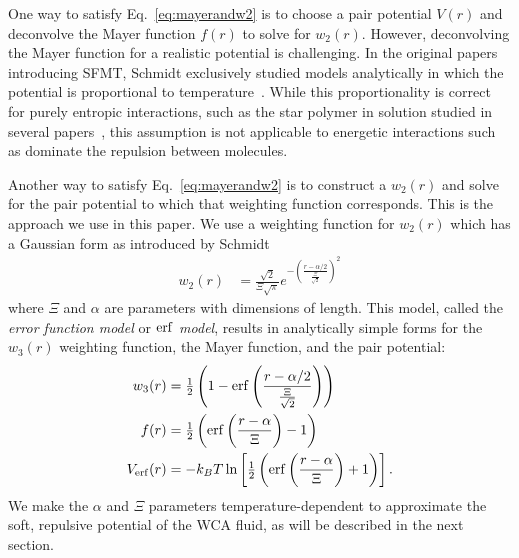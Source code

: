 \documentclass[letterpaper,twocolumn,amsmath,amssymb,prb]{revtex4-1}
\begin{document}
One way to satisfy Eq.~\ref{eq:mayerandw2} is to choose a pair 
potential $V(r)$ and deconvolve the Mayer function $f(r)$ to solve for $w_2(r)$. 
However, deconvolving the Mayer function for a realistic potential is 
challenging. %
In the original papers introducing SFMT, Schmidt
exclusively studied models analytically in which the potential is
proportional to temperature~\cite{schmidt1999density,
  schmidt2000fluid}.  While this proportionality is correct for purely
entropic interactions, such as the star polymer in solution studied in
several papers~\cite{schmidt1999density}, this assumption is not
applicable to energetic interactions such as dominate the repulsion
between molecules.

Another way to satisfy Eq.~\ref{eq:mayerandw2} is to 
construct a $w_2(r)$ and solve for 
the pair potential to which that weighting function corresponds.  
This is the approach we use in this paper. We use a weighting function 
for $w_2(r)$ which has a Gaussian form as introduced by Schmidt~\cite{schmidt2000fluid} 
\begin{align}
  w_2(r) &= \frac{\sqrt{2}}{\Xi \sqrt{\pi}} e^{-\left( \frac{r-\alpha/2}
  {\frac{\Xi}{\sqrt{2}}} \right)^2}
  \label{eq:gaussianw2}
\end{align}
where $\Xi$ and $\alpha$ are parameters with dimensions of length. 
This model, called the \emph{error function model} or \emph{$\mathrm{erf}$ model},
results in analytically simple forms 
for the $w_3(r)$ weighting function, the Mayer function, and the pair
potential:
\begin{align}
  w_3(r) &= \tfrac12 \left( 1 - \mathrm{erf}\left(\frac{r-\alpha/2}
  {\frac{\Xi}{\sqrt{2}}}\right) \right) \\
  f(r) &= \tfrac12 \left( \mathrm{erf}\left( \frac{r - \alpha}{\Xi} 
  \right) - 1 \right) \label{eq:mayer-approx} \\
  V_{\mathrm{erf}}(r) &= -k_BT\ln\left[\tfrac12 \left( \mathrm{erf}\left( \frac{r -
    \alpha}{\Xi} \right) + 1 \right) \right].\label{eq:Verf}
\end{align}
We make the $\alpha$ and $\Xi$ parameters temperature-dependent 
to approximate the soft, repulsive potential of the WCA fluid,
as will be described in the next section.
\end{document}
